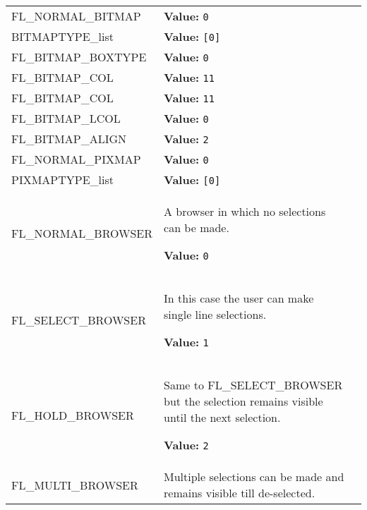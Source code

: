 \begin{longtable}{|p{\varnamewidth}|p{\vardescrwidth}|l}
\raggedright F\-L\-\_\-N\-O\-R\-M\-A\-L\-\_\-B\-I\-T\-M\-A\-P\- & \raggedright \textbf{Value:} 
{\tt 0}&\\
\cline{1-2}
\raggedright B\-I\-T\-M\-A\-P\-T\-Y\-P\-E\-\_\-l\-i\-s\-t\- & \raggedright \textbf{Value:} 
{\tt \texttt{[}0\texttt{]}}&\\
\cline{1-2}
\raggedright F\-L\-\_\-B\-I\-T\-M\-A\-P\-\_\-B\-O\-X\-T\-Y\-P\-E\- & \raggedright \textbf{Value:} 
{\tt 0}&\\
\cline{1-2}
\raggedright F\-L\-\_\-B\-I\-T\-M\-A\-P\-\_\-C\-O\-L\-1\- & \raggedright \textbf{Value:} 
{\tt 11}&\\
\cline{1-2}
\raggedright F\-L\-\_\-B\-I\-T\-M\-A\-P\-\_\-C\-O\-L\-2\- & \raggedright \textbf{Value:} 
{\tt 11}&\\
\cline{1-2}
\raggedright F\-L\-\_\-B\-I\-T\-M\-A\-P\-\_\-L\-C\-O\-L\- & \raggedright \textbf{Value:} 
{\tt 0}&\\
\cline{1-2}
\raggedright F\-L\-\_\-B\-I\-T\-M\-A\-P\-\_\-A\-L\-I\-G\-N\- & \raggedright \textbf{Value:} 
{\tt 2}&\\
\cline{1-2}
\raggedright F\-L\-\_\-N\-O\-R\-M\-A\-L\-\_\-P\-I\-X\-M\-A\-P\- & \raggedright \textbf{Value:} 
{\tt 0}&\\
\cline{1-2}
\raggedright P\-I\-X\-M\-A\-P\-T\-Y\-P\-E\-\_\-l\-i\-s\-t\- & \raggedright \textbf{Value:} 
{\tt \texttt{[}0\texttt{]}}&\\
\cline{1-2}
\raggedright F\-L\-\_\-N\-O\-R\-M\-A\-L\-\_\-B\-R\-O\-W\-S\-E\-R\- & \raggedright A browser in which no selections can be made.

\textbf{Value:} 
{\tt 0}&\\
\cline{1-2}
\raggedright F\-L\-\_\-S\-E\-L\-E\-C\-T\-\_\-B\-R\-O\-W\-S\-E\-R\- & \raggedright In this case the user can make single line selections.

\textbf{Value:} 
{\tt 1}&\\
\cline{1-2}
\raggedright F\-L\-\_\-H\-O\-L\-D\-\_\-B\-R\-O\-W\-S\-E\-R\- & \raggedright Same to FL\_SELECT\_BROWSER but the selection remains visible until
the next selection.

\textbf{Value:} 
{\tt 2}&\\
\cline{1-2}
\raggedright F\-L\-\_\-M\-U\-L\-T\-I\-\_\-B\-R\-O\-W\-S\-E\-R\- & \raggedright Multiple selections can be made and remains visible till de-selected.


\end{longtable}
